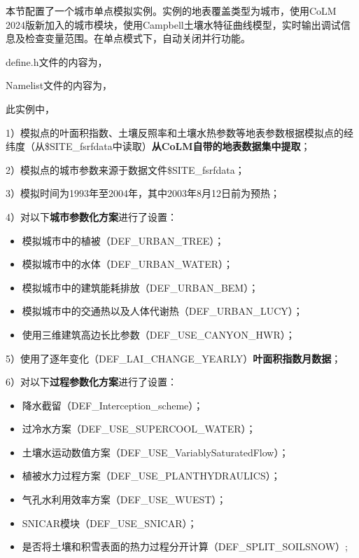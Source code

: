 \documentclass[a4paper,12pt,twoside]{article}
\begin{document}
本节配置了一个城市单点模拟实例。实例的地表覆盖类型为城市，使用CoLM 2024版新加入的城市模块，使用Campbell土壤水特征曲线模型，实时输出调试信息及检查变量范围。在单点模式下，自动关闭并行功能。

define.h文件的内容为，


Namelist文件的内容为，


此实例中，\par
1）模拟点的叶面积指数、土壤反照率和土壤水热参数等地表参数根据模拟点的经纬度（从\$SITE\_fsrfdata中读取）\textbf{从CoLM自带的地表数据集中提取}；\par
2）模拟点的城市参数来源于数据文件\$SITE\_fsrfdata；\par
3）模拟时间为1993年至2004年，其中2003年8月12日前为预热；\par
4）对以下\textbf{城市参数化方案}进行了设置：
\begin{itemize}[nosep,leftmargin=4em]
    \item 模拟城市中的植被（DEF\_URBAN\_TREE）；
    \item 模拟城市中的水体（DEF\_URBAN\_WATER）；
    \item 模拟城市中的建筑能耗排放（DEF\_URBAN\_BEM）；
    \item 模拟城市中的交通热以及人体代谢热（DEF\_URBAN\_LUCY）；
    \item 使用三维建筑高边长比参数（DEF\_USE\_CANYON\_HWR）；
\end{itemize} \par
5）使用了逐年变化（DEF\_LAI\_CHANGE\_YEARLY）\textbf{叶面积指数月数据}；\par
6）对以下\textbf{过程参数化方案}进行了设置：
\begin{itemize}[nosep,leftmargin=4em]
    \item 降水截留（DEF\_Interception\_scheme）；
    \item 过冷水方案（DEF\_USE\_SUPERCOOL\_WATER）；
    \item 土壤水运动数值方案（DEF\_USE\_VariablySaturatedFlow）；
    \item 植被水力过程方案（DEF\_USE\_PLANTHYDRAULICS）；
    \item 气孔水利用效率方案（DEF\_USE\_WUEST）；
    \item SNICAR模块（DEF\_USE\_SNICAR）；
    \item 是否将土壤和积雪表面的热力过程分开计算（DEF\_SPLIT\_SOILSNOW）;
\end{itemize}
\end{document}
